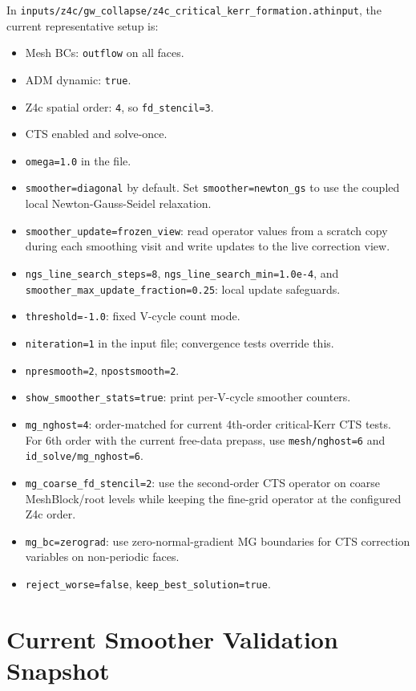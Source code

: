 \documentclass[11pt]{article}
\newcommand{\file}[1]{\nolinkurl{#1}}
\newcommand{\code}[1]{\texttt{#1}}
\begin{document}
In \file{inputs/z4c/gw\_collapse/z4c\_critical\_kerr\_formation.athinput}, the
current representative setup is:
\begin{itemize}
  \item Mesh BCs: \code{outflow} on all faces.
  \item ADM dynamic: \code{true}.
  \item Z4c spatial order: \code{4}, so \code{fd\_stencil=3}.
  \item CTS enabled and solve-once.
  \item \code{omega=1.0} in the file.
  \item \code{smoother=diagonal} by default.  Set
        \code{smoother=newton\_gs} to use the coupled local
        Newton-Gauss-Seidel relaxation.
  \item \code{smoother\_update=frozen\_view}: read operator values from a
        scratch copy during each smoothing visit and write updates to the live
        correction view.
  \item \code{ngs\_line\_search\_steps=8},
        \code{ngs\_line\_search\_min=1.0e-4}, and
        \code{smoother\_max\_update\_fraction=0.25}: local update safeguards.
  \item \code{threshold=-1.0}: fixed V-cycle count mode.
  \item \code{niteration=1} in the input file; convergence tests override this.
  \item \code{npresmooth=2}, \code{npostsmooth=2}.
  \item \code{show\_smoother\_stats=true}: print per-V-cycle smoother counters.
  \item \code{mg\_nghost=4}: order-matched for current 4th-order critical-Kerr
        CTS tests.  For 6th order with the current free-data prepass, use
        \code{mesh/nghost=6} and \code{id\_solve/mg\_nghost=6}.
  \item \code{mg\_coarse\_fd\_stencil=2}: use the second-order CTS operator on
        coarse MeshBlock/root levels while keeping the fine-grid operator at the
        configured Z4c order.
  \item \code{mg\_bc=zerograd}: use zero-normal-gradient MG boundaries for CTS
        correction variables on non-periodic faces.
  \item \code{reject\_worse=false}, \code{keep\_best\_solution=true}.
\end{itemize}

\section{Current Smoother Validation Snapshot}
\end{document}
